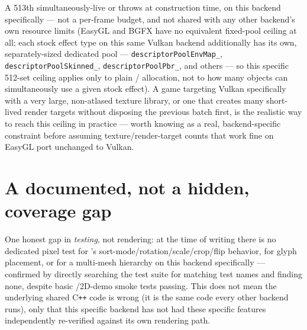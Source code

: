 A 513th simultaneously-live  or  throws at
construction time, on this backend specifically --- not a per-frame budget, and not shared with
any other backend's own resource limits (EasyGL and BGFX have no equivalent fixed-pool
ceiling at all; each stock effect type on this same Vulkan backend additionally has its own,
separately-sized dedicated pool --- \texttt{descriptorPoolEnvMap\_},
\texttt{descriptorPoolSkinned\_}, \texttt{descriptorPoolPbr\_}, and others --- so this specific
512-set ceiling applies only to plain  / 
allocation, not to how many objects can simultaneously use a given stock effect). A game
targeting Vulkan specifically with a very large, non-atlased texture library, or one that
creates many short-lived render targets without disposing the previous batch first, is the
realistic way to reach this ceiling in practice --- worth knowing as a real, backend-specific
constraint before assuming texture/render-target counts that work fine on EasyGL port
unchanged to Vulkan.

\section{A documented, not a hidden, coverage gap}

One honest gap in \emph{testing}, not rendering: at the time of writing there is no dedicated
pixel test for 's sort-mode/rotation/scale/crop/flip behavior, for
 glyph placement, or for a multi-mesh  hierarchy on this
backend specifically --- confirmed by directly searching the test suite for matching test
names and finding none, despite basic /2D-demo smoke tests passing.
This does not mean the underlying shared C\texttt{++} code is wrong (it is the same code
every other backend runs), only that this specific backend has not had these specific
features independently re-verified against its own rendering path.
